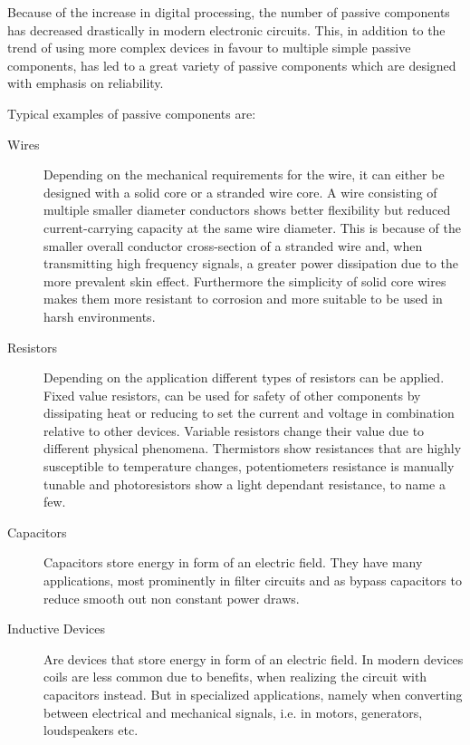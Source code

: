 Because of the increase in digital processing, the number of passive components has decreased drastically in modern electronic circuits. This, in addition to the trend of using more complex devices in favour to multiple simple passive components, has led to a great variety of passive components which are designed with emphasis on reliability.

Typical examples of passive components are:
\begin{description}
    \item[Wires] Depending on the mechanical requirements for the wire, it can either be designed with a solid core or a stranded wire core. A wire consisting of multiple smaller diameter conductors shows better flexibility but reduced current-carrying capacity at the same wire diameter. This is because of the smaller overall conductor cross-section of a stranded wire and, when transmitting high frequency signals, a greater power dissipation due to the more prevalent skin effect. Furthermore the simplicity of solid core wires makes them more resistant to corrosion and more suitable to be used in harsh environments.
    \item[Resistors] Depending on the application different types of resistors can be applied. Fixed value resistors, can be used for safety of other components by dissipating heat or reducing to set the current and voltage in combination relative to other devices. Variable resistors change their value due to different physical phenomena. Thermistors show resistances that are highly susceptible to temperature changes, potentiometers resistance is manually tunable and photoresistors show a light dependant resistance, to name a few.
    \item[Capacitors] Capacitors store energy in form of an electric field. They have many applications, most prominently in filter circuits and as bypass capacitors to reduce smooth out non constant power draws.
    \item[Inductive Devices] Are devices that store energy in form of an electric field. In modern devices coils are less common due to benefits, when realizing the circuit with capacitors instead. But in specialized applications, namely when converting between electrical and mechanical signals, i.e. in motors, generators, loudspeakers etc.
\end{description}

